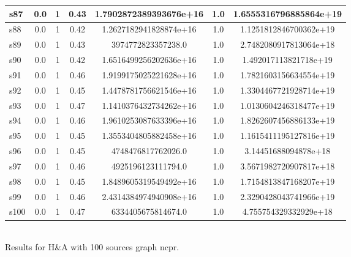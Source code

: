 \documentclass{article}
\begin{document}
\begin{tabular}{|l|c|c|c|c|c|c|}
\hline
s87 &0.0 & 1 & 0.43 & 1.7902872389393676e+16 & 1.0 & 1.6555316796885864e+19\\
\hline
s88 &0.0 & 1 & 0.42 & 1.2627182941828874e+16 & 1.0 & 1.1251812846700362e+19\\
\hline
s89 &0.0 & 1 & 0.43 & 3974772823357238.0 & 1.0 & 2.7482080917813064e+18\\
\hline
s90 &0.0 & 1 & 0.42 & 1.6516499256202636e+16 & 1.0 & 1.492017113821718e+19\\
\hline
s91 &0.0 & 1 & 0.46 & 1.9199175025221628e+16 & 1.0 & 1.7821603156634554e+19\\
\hline
s92 &0.0 & 1 & 0.45 & 1.4478781756621546e+16 & 1.0 & 1.3304467721928714e+19\\
\hline
s93 &0.0 & 1 & 0.47 & 1.1410376432734262e+16 & 1.0 & 1.0130604246318477e+19\\
\hline
s94 &0.0 & 1 & 0.46 & 1.9610253087633396e+16 & 1.0 & 1.8262607456886133e+19\\
\hline
s95 &0.0 & 1 & 0.45 & 1.3553404805882458e+16 & 1.0 & 1.1615411195127816e+19\\
\hline
s96 &0.0 & 1 & 0.45 & 4748476817762026.0 & 1.0 & 3.14451688094878e+18\\
\hline
s97 &0.0 & 1 & 0.46 & 4925196123111794.0 & 1.0 & 3.5671982720907817e+18\\
\hline
s98 &0.0 & 1 & 0.45 & 1.8489605319549492e+16 & 1.0 & 1.7154813847168207e+19\\
\hline
s99 &0.0 & 1 & 0.46 & 2.4314384974940908e+16 & 1.0 & 2.3290428043741966e+19\\
\hline
s100 &0.0 & 1 & 0.47 & 6334405675814674.0 & 1.0 & 4.755754329332929e+18\\
\hline
\end{tabular}\\

\noindent Results for H\&A with 100 sources graph ncpr.
\end{document}
